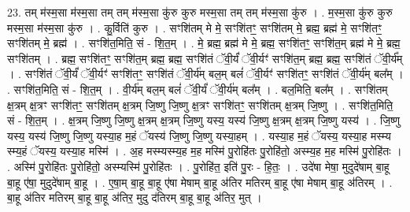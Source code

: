 \documentclass[17pt]{extarticle}
\begin{document}
23. तम् म॑स्म॒सा म॑स्म॒सा तम् तम् म॑स्म॒सा कु॑रु कुरु मस्म॒सा तम् तम् म॑स्म॒सा कु॑रु । . म॒स्म॒सा कु॑रु कुरु मस्म॒सा म॑स्म॒सा कु॑रु । . कु॒र्विति॑ कुरु । . सꣳशि॑तम् मे मे॒ सꣳशि॑तꣳ॒॒ सꣳशि॑तम् मे॒ ब्रह्म॒ ब्रह्म॑ मे॒ सꣳशि॑तꣳ॒॒ सꣳशि॑तम् मे॒ ब्रह्म॑ । . सꣳशि॑त॒मिति॒ सं - शि॒त॒म् । . मे॒ ब्रह्म॒ ब्रह्म॑ मे मे॒ ब्रह्म॒ सꣳशि॑तꣳ॒॒ सꣳशि॑त॒म् ब्रह्म॑ मे मे॒ ब्रह्म॒ सꣳशि॑तम् । . ब्रह्म॒ सꣳशि॑तꣳ॒॒ सꣳशि॑त॒म् ब्रह्म॒ ब्रह्म॒ सꣳशि॑तं ॅवी॒र्यं॑ ॅवी॒र्यꣳ॑ सꣳशि॑त॒म् ब्रह्म॒ ब्रह्म॒ सꣳशि॑तं ॅवी॒र्य᳚म् । . सꣳशि॑तं ॅवी॒र्यं॑ ॅवी॒र्यꣳ॑ सꣳशि॑तꣳ॒॒ सꣳशि॑तं ॅवी॒र्य॑म् बल॒म् बलं॑ ॅवी॒र्यꣳ॑ सꣳशि॑तꣳ॒॒ सꣳशि॑तं ॅवी॒र्य॑म् बल᳚म् । . सꣳशि॑त॒मिति॒ सं - शि॒त॒म् । . वी॒र्य॑म् बल॒म् बलं॑ ॅवी॒र्यं॑ ॅवी॒र्य॑म् बल᳚म् । . बल॒मिति॒ बल᳚म् । . सꣳशि॑तम् क्ष॒त्रम् क्ष॒त्रꣳ सꣳशि॑तꣳ॒॒ सꣳशि॑तम् क्ष॒त्रम् जि॒ष्णु जि॒ष्णु क्ष॒त्रꣳ सꣳशि॑तꣳ॒॒ सꣳशि॑तम् क्ष॒त्रम् जि॒ष्णु । . सꣳशि॑त॒मिति॒ सं - शि॒त॒म् । . क्ष॒त्रम् जि॒ष्णु जि॒ष्णु क्ष॒त्रम् क्ष॒त्रम् जि॒ष्णु यस्य॒ यस्य॑ जि॒ष्णु क्ष॒त्रम् क्ष॒त्रम् जि॒ष्णु यस्य॑ । . जि॒ष्णु यस्य॒ यस्य॑ जि॒ष्णु जि॒ष्णु यस्या॒ह म॒हं ॅयस्य॑ जि॒ष्णु जि॒ष्णु यस्या॒हम् । . यस्या॒ह म॒हं ॅयस्य॒ यस्या॒ह मस्म्य स्म्य॒हं ॅयस्य॒ यस्या॒ह मस्मि॑ । . अ॒ह मस्म्यस्म्य॒ह म॒ह मस्मि॑ पु॒रोहि॑तः पु॒रोहि॑तो॒ अस्म्य॒ह म॒ह मस्मि॑ पु॒रोहि॑तः । . अस्मि॑ पु॒रोहि॑तः पु॒रोहि॑तो॒ अस्म्यस्मि॑ पु॒रोहि॑तः । . पु॒रोहि॑त॒ इति॑ पु॒रः - हि॒तः॒ । . उदे॑षा मेषा॒ मुदुदे॑षाम् बा॒हू बा॒हू ए॑षा॒ मुदुदे॑षाम् बा॒हू । . ए॒षा॒म् बा॒हू बा॒हू ए॑षा मेषाम् बा॒हू अ॑तिर मतिरम् बा॒हू ए॑षा मेषाम् बा॒हू अ॑तिरम् । . बा॒हू अ॑तिर मतिरम् बा॒हू बा॒हू अ॑तिर॒ मुदु द॑तिरम् बा॒हू बा॒हू अ॑तिर॒ मुत् । \newline
\end{document}

